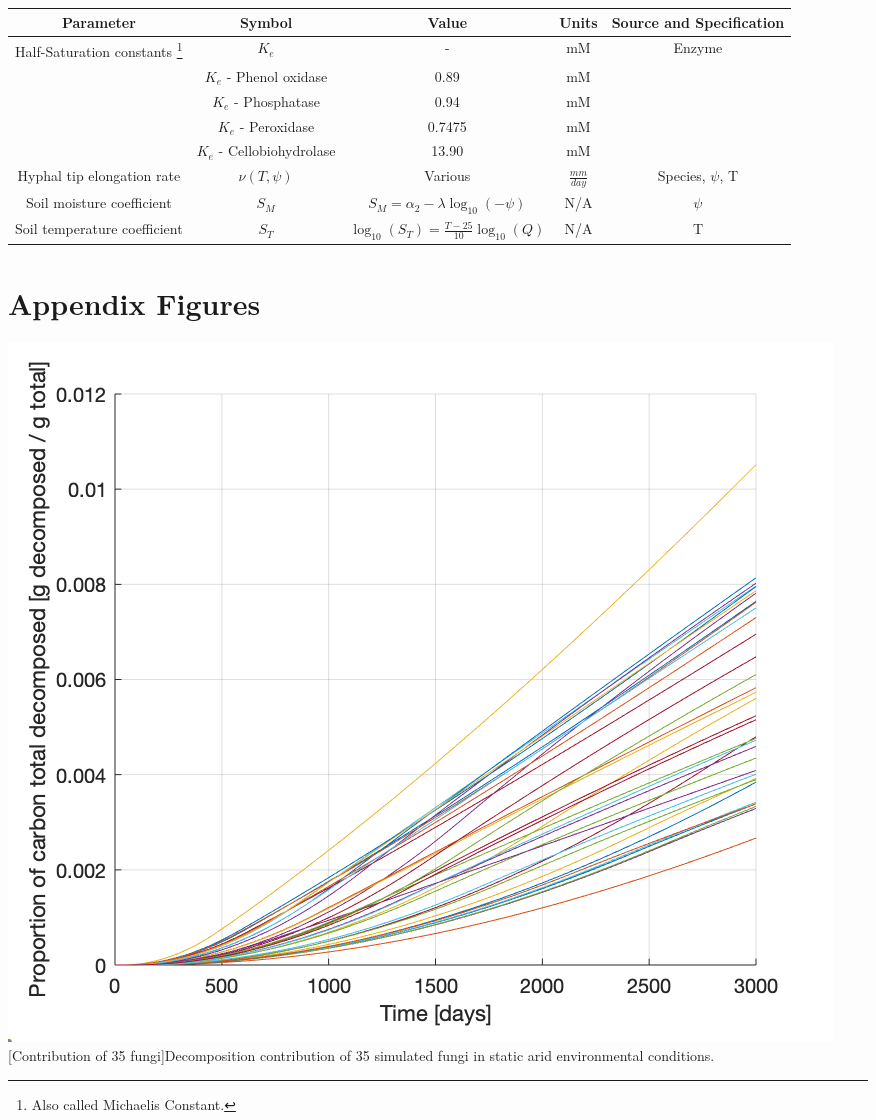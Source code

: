 \documentclass[12pt]{article}
\begin{document}
\begin{savenotes}
	\begin{table}[H]
		\begin{center}
			\begin{adjustbox}{width=1\textwidth}
			\begin{tabular}{|c c c c c|} 
				\hline
				Parameter & Symbol & Value & Units & Source and Specification \\
				\hline\hline
				Half-Saturation constants \footnote{Also called Michaelis Constant.} & $K_e$ & - & mM &  Enzyme \\ 
				& $K_e$ - Phenol oxidase & 0.89 & mM &  \cite{Davidson2012}\\
				& $K_e$ - Phosphatase & 0.94 & mM &  \cite{Nannipieri2011}\\
				& $K_e$ - Peroxidase & 0.7475 & mM &  \cite{Chance1943}\\
				& $K_e$ - Cellobiohydrolase & 13.90 & mM &  \cite{Razavi2015}\\
				\hline
				Hyphal tip elongation rate& $\nu(T,\psi)$& Various & $\frac{mm}{day}$ & \cite{Maynard2019} Species, $\psi$, T\\
				\hline
				Soil moisture coefficient & $S_M$ & $S_M = \alpha_2 -\lambda \log_{10}(-\psi)$ & N/A &\cite{Moorhead1991} $\psi$\\ %
				\hline
				Soil temperature coefficient & $S_T$ & $\log_{10}(S_T) = \frac{T-25}{10}\log_{10}(Q)$ & N/A &\cite{Moorhead1991} T\\ 
				\hline
			\end{tabular}
			\end{adjustbox}
		\vspace*{-3ex}
		\label{table5}
		\end{center}
	\end{table}
\end{savenotes}

\vspace*{-4ex}
\section{Appendix Figures}

\begin{center}\label{Rainbow Spaghetti}
\includegraphics[width=0.6\linewidth]{contributions_over_time(rainbowspaghetti).png}
[Contribution of 35 fungi]{Decomposition contribution of 35 simulated fungi in static arid environmental conditions.}
\end{center}
\end{document}
